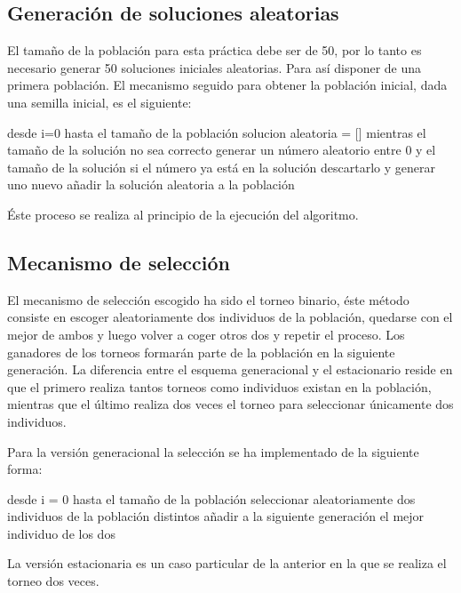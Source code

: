 \documentclass[twoside]{article}
\begin{document}
\subsection{Generación de soluciones aleatorias}

El tamaño de la población para esta práctica debe ser de 50, por lo tanto
es necesario generar 50 soluciones iniciales aleatorias. Para así disponer
de una primera población. El mecanismo seguido para obtener la población
inicial, dada una semilla inicial, es el siguiente:

\begin{pythoncode}
desde i=0 hasta el tamaño de la población
    solucion aleatoria = []
    mientras el tamaño de la solución no sea correcto
        generar un número aleatorio entre 0 y el tamaño de la solución
            si el número ya está en la solución descartarlo y generar uno nuevo
    añadir la solución aleatoria a la población
\end{pythoncode}

Éste proceso se realiza al principio de la ejecución del algoritmo.

\subsection{Mecanismo de selección}

El mecanismo de selección escogido ha sido el torneo binario, éste método
consiste en escoger aleatoriamente dos individuos de la población, quedarse
con el mejor de ambos y luego volver a coger otros dos y repetir el proceso.
Los ganadores de los torneos formarán parte de la población en la siguiente
generación. La diferencia entre el esquema generacional y el estacionario reside en que el primero realiza tantos
torneos como individuos existan en la población, mientras que el último
realiza dos veces el torneo para seleccionar únicamente dos individuos.

Para la versión generacional la selección se ha implementado de la siguiente forma:

\begin{pythoncode}
desde i = 0 hasta el tamaño de la población
    seleccionar aleatoriamente dos individuos de la población distintos
    añadir a la siguiente generación el mejor individuo de los dos
\end{pythoncode}

La versión estacionaria es un caso particular de la anterior en la que se
realiza el torneo dos veces.
\end{document}
